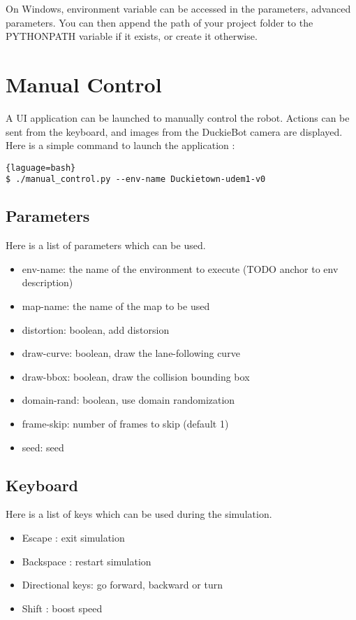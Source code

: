 On Windows, environment variable can be accessed in the parameters,  advanced parameters. You can then append the path of your project folder to the PYTHONPATH variable if it exists, or create it otherwise.

\section{Manual Control}
A UI application can be launched to manually control the robot. Actions can be sent from the keyboard, and images from the DuckieBot camera are displayed. Here is a simple command to launch the application :

\begin{lstlisting}{laguage=bash}
$ ./manual_control.py --env-name Duckietown-udem1-v0
\end{lstlisting}

\subsection{Parameters}
Here is a list of parameters which can be used.

\begin{itemize}
	\item env-name: the name of the environment to execute (TODO anchor to env description)
	\item map-name: the name of the map to be used
	\item distortion: boolean, add distorsion
	\item draw-curve: boolean, draw the lane-following curve
	\item draw-bbox: boolean, draw the collision bounding box
	\item domain-rand: boolean, use domain randomization
	\item frame-skip: number of frames to skip (default 1)
	\item seed: seed
\end{itemize}

\subsection{Keyboard}
Here is a list of keys which can be used during the simulation.

\begin{itemize}
	\item Escape : exit simulation
	\item Backspace : restart simulation
	\item Directional keys: go forward, backward or turn
	\item Shift : boost speed
\end{itemize}

